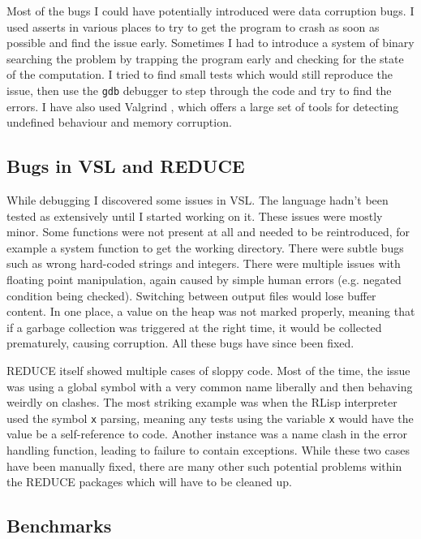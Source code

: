 Most of the bugs I could have potentially introduced were data corruption bugs.
I used asserts in various places to try to get the program to crash as soon as possible
and find the issue early. Sometimes I had to introduce a system of binary searching the
problem by trapping the program early and checking for the state of the computation.
I tried to find small tests which would still reproduce the issue, then use the
\texttt{gdb} \cite{gdb} debugger to step through the code and try to find the errors. I have also used
Valgrind \cite{valgrind}, which offers a large set of tools for detecting undefined behaviour and memory
corruption.

\subsection{Bugs in VSL and REDUCE}

While debugging I discovered some issues in VSL. The language hadn't been tested
as extensively until I started working on it. These issues were mostly minor. Some functions
were not present at all and needed to be reintroduced, for example a system function to get
the working directory. There were subtle bugs such as wrong
hard-coded strings and integers. There were multiple issues with floating point manipulation,
again caused by simple human errors (e.g. negated condition being checked). Switching between
output files would lose buffer content. In one place, a value on the heap was not marked
properly, meaning that if a garbage collection was triggered at the right time, it would
be collected prematurely, causing corruption. All these bugs have since been fixed.

REDUCE itself showed multiple cases of sloppy code. Most of the time, the issue was using
a global symbol with a very common name liberally and then behaving weirdly
on clashes. The most striking example was when the RLisp interpreter used the symbol \texttt{x}
parsing, meaning any tests using the variable \texttt{x} would have the value be a self-reference
to code. Another instance was a name clash in the error handling function, leading to failure
to contain exceptions. While these two cases have been manually fixed, there are many other
such potential problems within the REDUCE packages which will have to be cleaned up.

\subsection{Benchmarks}

